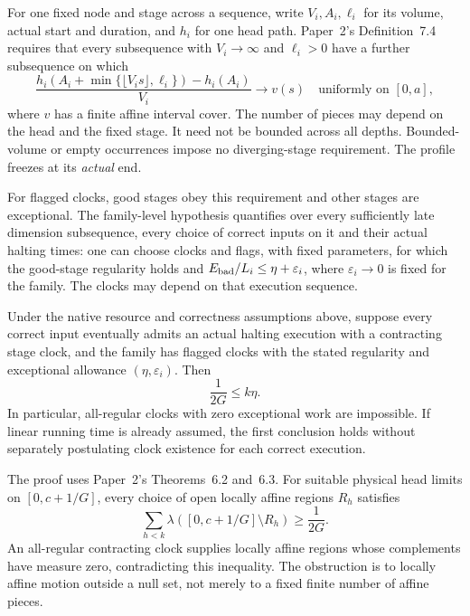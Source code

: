 For one fixed node and stage across a sequence, write $V_i,A_i,\ell_i$
for its volume, actual start and duration, and $h_i$ for one head path.
Paper~2's Definition~7.4 requires that every subsequence with
$V_i\to\infty$ and $\ell_i>0$ have a further subsequence on which
\begin{equation}
\label{eq:profile}
 \frac{h_i(A_i+\min\{\lfloor V_i s\rfloor,\ell_i\})-h_i(A_i)}{V_i}
 \longrightarrow v(s)\quad\text{uniformly on }[0,a],
\end{equation}
where $v$ has a finite affine interval cover. The number of pieces may
depend on the head and the fixed stage. It need not be bounded across
all depths. Bounded-volume or empty occurrences impose no diverging-stage
requirement. The profile freezes at its \emph{actual} end.

For flagged clocks, good stages obey this requirement and other stages are
exceptional. The family-level hypothesis quantifies over every sufficiently
late dimension subsequence, every choice of correct inputs on it and their
actual halting times: one can choose clocks and flags, with fixed parameters,
for which the good-stage regularity holds and
$E_{\rm bad}/L_i\le\eta+\varepsilon_i$, where $\varepsilon_i\to0$ is fixed
for the family. The clocks may depend on that execution sequence.

\begin{theorem}
\label{thm:imported}
Under the native resource and correctness assumptions above, suppose every
correct input eventually admits an actual halting execution with a
contracting stage clock, and the family has flagged clocks with the stated
regularity and exceptional allowance $(\eta,\varepsilon_i)$. Then
\[
                  \frac1{2G}\le k\eta.
\]
In particular, all-regular clocks with zero exceptional work are impossible.
If linear running time is already assumed, the first conclusion holds
without separately postulating clock existence for each correct execution.
\end{theorem}

The proof uses Paper~2's Theorems~6.2 and~6.3. For suitable physical head
limits on $[0,c+1/G]$, every choice of open locally affine regions $R_h$
satisfies
\begin{equation}
\label{eq:affine-toll}
 \sum_{h<k}\lambda([0,c+1/G]\setminus R_h)\ge\frac1{2G}.
\end{equation}
An all-regular contracting clock supplies locally affine regions whose
complements have measure zero, contradicting this inequality. The
obstruction is to locally affine motion outside a null set, not merely
to a fixed finite number of affine pieces.

